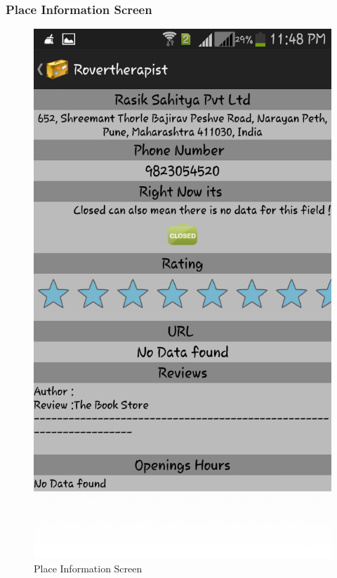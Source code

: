 \documentclass[12pt,a4paper]{article}
\begin{document}
\subsubsection{Place Information Screen}
\begin{figure}[!htb]
\centering
\includegraphics[width=12 cm]{place}
\caption{Place Information Screen}
\end{figure}
\\
\end{document}

